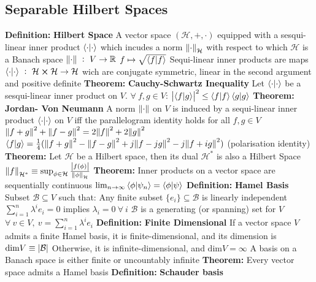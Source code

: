 \documentclass[14pt]{extarticle}
\def\Definition{{\color{blue} \textbf{Definition:} }}
\def\Theorem{{\color{red} \textbf{Theorem:} }}
\begin{document}
\begin{outline}
	\section*{Separable Hilbert Spaces}
		\1	\Definition \textbf{Hilbert Space}
			\2	A vector space $(\mathcal{H},+,\cdot)$ equipped with a sesqui-linear
					inner product $\braket{\cdot}{\cdot}$ which incudes a norm
					$\norm{\cdot}_{\mathcal{H}}$ with respect to which $\mathcal{H}$ is
					a Banach space
					\3	$\norm{\cdot}~:~V \rightarrow \mathbb{R}$
					\3	$f \mapsto \sqrt{\braket{f}{f}}$
			\2	Sequi-linear inner products are maps 
					$\braket{\cdot}{\cdot}~:~\mathcal{H} \cross \mathcal{H} \rightarrow \mathcal{H}$
					wich are conjugate symmetric, linear in the second argument and 
					positive definite
		\1	\Theorem \textbf{Cauchy-Schwartz Inequality}
			\2	Let $\braket{\cdot}{\cdot}$ be a sesqui-linear inner product
					on $V$.  $\forall~f,g \in V$:
			\2	$\abs{\braket{f}{g}}^2 \le \braket{f}{f}\braket{g}{g}$
		\1	\Theorem \textbf{Jordan- Von Neumann}
			\2	A norm $\norm{\cdot}$ on $V$ is induced by a sequi-linear inner
					product $\braket{\cdot}{\cdot}$ on $V$ iff the parallelogram identity
					holds for all $f,g \in V$
			\2	$\norm{f + g}^2 + \norm{f - g}^2 = 2\norm{f}^2 + 2\norm{g}^2$
			\2	$\braket{f}{g} = \frac{1}{4}(\norm{f+g}^2 - \norm{f-g}^2 +
					j\norm{f - jg}^2 - j\norm{f + ig}^2)$ (polarisation identity)
		\1	\Theorem Let $\mathcal{H}$ be a Hilbert space, then its dual
				$\mathcal{H}^*$ is also a Hilbert Space
			\2	$\norm{f}_{\mathcal{H}^*} \equiv \sup_{\phi \in \mathcal{H}}
					\frac{\abs{f(\phi)}}{\norm{\phi}_{\mathcal{H}}}$
		\1	\Theorem Inner products on a vector space are sequentially continuous
			\2	$\lim_{n \rightarrow \infty} \braket{\phi}{\psi_n} = \braket{\phi}{\psi}$
		\1	\Definition \textbf{Hamel Basis}
			\2	Subset $\mathcal{B} \subseteq V$ such that:
				\3	Any finite subset $\{e_i\} \subseteq \mathcal{B}$ is linearly independent
					\4	$\sum_{i=1}^n \lambda^ie_i = 0$ implies $\lambda_i = 0~\forall~i$
				\3	$\mathcal{B}$ is a generating (or spanning) set for $V$
					\4	$\forall~v \in V,~v = \sum_{i=1}^n \lambda^i e_i$
			\2	\Definition \textbf{Finite Dimensional}
				\3	If a vector space $V$ admits a finite Hamel basis, it is finite-dimensional,
						and its dimension is $\text{dim}V \equiv \abs{\mathcal{B}}$
				\3	Otherwise, it is infinite-dimensional, and $\text{dim}V = \infty$
				\3	A basis on a Banach space is either finite or uncountably infinite
		\1	\Theorem Every vector space admits a Hamel basis
		\1	\Definition \textbf{Schauder basis}

\end{outline}
\end{document}
